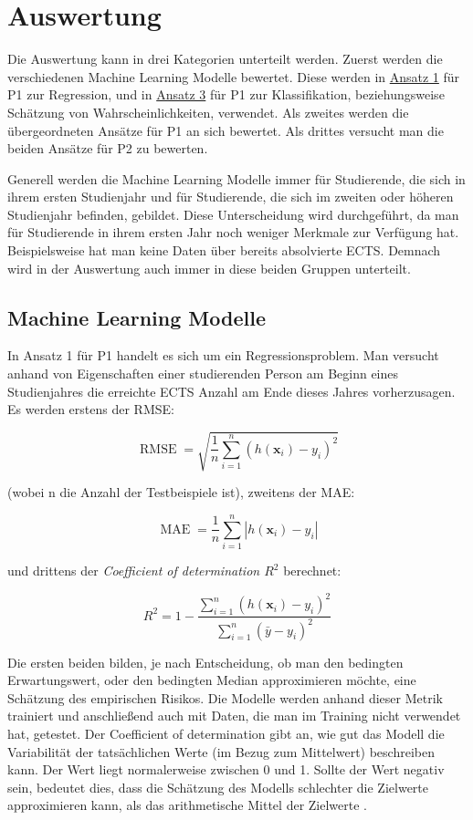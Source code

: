 

\section{Auswertung}
\label{sec:auswertung}
Die Auswertung kann in drei Kategorien unterteilt werden. Zuerst werden die verschiedenen Machine Learning Modelle bewertet.
Diese werden in \hyperref[sec:appr1]{Ansatz 1} f\"ur P1 zur Regression, und in \hyperref[sec:appr2]{Ansatz 3} f\"ur P1 zur Klassifikation,
beziehungsweise Sch\"atzung von Wahrscheinlichkeiten, verwendet.
Als zweites werden die \"ubergeordneten Ans\"atze f\"ur P1 an sich bewertet.
Als drittes versucht man die beiden Ans\"atze f\"ur P2 zu bewerten.

Generell werden die Machine Learning Modelle immer f\"ur Studierende, die sich in ihrem ersten Studienjahr und f\"ur Studierende, die sich im
zweiten oder h\"oheren Studienjahr befinden, gebildet. Diese Unterscheidung wird durchgef\"uhrt, da man f\"ur Studierende in ihrem ersten Jahr noch
weniger Merkmale zur Verf\"ugung hat. Beispielsweise hat man keine Daten \"uber bereits absolvierte ECTS. Demnach wird in der Auswertung
auch immer in diese beiden Gruppen unterteilt.


\subsection{Machine Learning Modelle}
In Ansatz 1 f\"ur P1 handelt es sich um ein Regressionsproblem. Man versucht anhand von Eigenschaften einer studierenden Person am Beginn eines Studienjahres
die erreichte ECTS Anzahl am Ende dieses Jahres vorherzusagen. Es werden erstens der
\gls{RMSE}:

$$ \operatorname{RMSE} = \sqrt{\frac{1}{n}\sum_{i = 1}^{n}(h(\mathbf{x}_i)-y_i)^2} $$

(wobei n die Anzahl der Testbeispiele ist), zweitens der \gls{MAE}:

$$ \operatorname{MAE} = \frac{1}{n}\sum_{i = 1}^{n}|h(\mathbf{x}_i) - y_i| $$

und drittens der \textit{Coefficient of determination $R^2$} berechnet:

$$ R^2 = 1 - \frac{\sum_{i = 1}^{n}(h(\mathbf{x}_i) - y_i)^2}{\sum_{i=1}^n(\bar{y}-y_i)^2} $$

Die ersten beiden bilden, je nach Entscheidung, ob man den bedingten Erwartungswert, oder den bedingten Median
approximieren m\"ochte, eine Sch\"atzung des empirischen Risikos. Die Modelle werden anhand dieser Metrik trainiert und anschlie{\ss}end
auch mit Daten, die man im Training nicht verwendet hat, getestet. Der Coefficient of determination gibt an, wie gut das Modell
die Variabilit\"at der tats\"achlichen Werte (im Bezug zum Mittelwert) beschreiben kann. Der Wert liegt normalerweise zwischen 0 und 1. Sollte der Wert negativ sein,
bedeutet dies, dass die Sch\"atzung des Modells schlechter die Zielwerte approximieren kann, als das arithmetische Mittel der Zielwerte \cite{guttag}.


